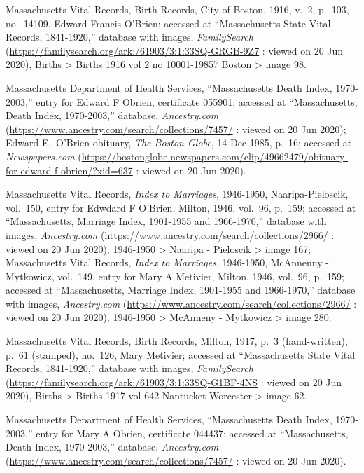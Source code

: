 \begin{thebibliography}{999}

Massachusetts Vital Records, Birth Records, City of Boston, 1916, v.\ 2, p.\ 103, no.\ 14109, Edward Francis O'Brien; accessed at ``Massachusetts State Vital Records, 1841-1920,'' database with images, \textit{FamilySearch} (\url{https://familysearch.org/ark:/61903/3:1:33SQ-GRGB-9Z7} : viewed on 20 Jun 2020), Births > Births 1916 vol 2 no 10001-19857 Boston > image 98.

Massachusetts Department of Health Services, ``Massachusetts Death Index, 1970-2003,'' entry for Edward F Obrien, certificate 055901; accessed at ``Massachusetts, Death Index, 1970-2003,'' database, \textit{Ancestry.com} (\url{https://www.ancestry.com/search/collections/7457/} : viewed on 20 Jun 2020); Edward F.\ O'Brien obituary, \textit{The Boston Globe}, 14 Dec 1985, p.\ 16; accessed at \textit{Newspapers.com} (\url{https://bostonglobe.newspapers.com/clip/49662479/obituary-for-edward-f-obrien/?xid=637} : viewed on 20 Jun 2020).

Massachusetts Vital Records, \textit{Index to Marriages}, 1946-1950, Naaripa-Pieloscik, vol.\ 150, entry for Edwdard F O'Brien, Milton, 1946, vol.\ 96, p.\ 159; accessed at ``Massachusetts, Marriage Index, 1901-1955 and 1966-1970,'' database with images, \textit{Ancestry.com} (\url{https://www.ancestry.com/search/collections/2966/} : viewed on 20 Jun 2020), 1946-1950 > Naaripa - Pieloscik > image 167; Massachusetts Vital Records, \textit{Index to Marriages}, 1946-1950, McAnnenny - Mytkowicz, vol.\ 149, entry for Mary A Metivier, Milton, 1946, vol.\ 96, p.\ 159; accessed at ``Massachusetts, Marriage Index, 1901-1955 and 1966-1970,'' database with images, \textit{Ancestry.com} (\url{https://www.ancestry.com/search/collections/2966/} : viewed on 20 Jun 2020), 1946-1950 > McAnneny - Mytkowicz > image 280.

Massachusetts Vital Records, Birth Records, Milton, 1917, p.\ 3 (hand-written), p.\ 61 (stamped), no.\ 126, Mary Metivier; accessed at ``Massachusetts State Vital Records, 1841-1920,'' database with images, \textit{FamilySearch} (\url{https://familysearch.org/ark:/61903/3:1:33SQ-G1BF-4NS} : viewed on 20 Jun 2020), Births > Births 1917 vol 642 Nantucket-Worcester > image 62.

Massachusetts Department of Health Services, ``Massachusetts Death Index, 1970-2003,'' entry for Mary A Obrien, certificate 044437; accessed at ``Massachusetts, Death Index, 1970-2003,'' database, \textit{Ancestry.com} (\url{https://www.ancestry.com/search/collections/7457/} : viewed on 20 Jun 2020).


\end{thebibliography}

